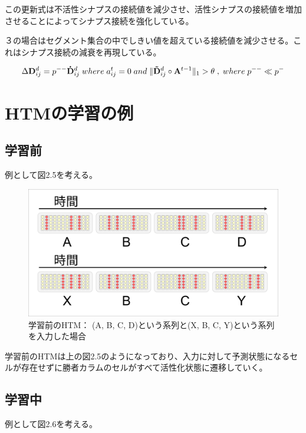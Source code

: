 この更新式は不活性シナプスの接続値を減少させ、活性シナプスの接続値を増加させることによってシナプス接続を強化している。

３の場合はセグメント集合の中でしきい値を超えている接続値を減少させる。これはシナプス接続の減衰を再現している。

\begin{equation}
  \Delta {\bf D}^d_{ij} = p^{--}{\bf \dot{D}}^d_{ij} \; where \; a^t_{ij} = 0 \; and \; \|{\bf \tilde{D}}^d_{ij} \circ {\bf A}^{t-1}\|_1 > \theta \; , \; where \; p^{--} \ll p^-
\end{equation}

\section{HTMの学習の例}

\subsection{学習前}
例として図2.5を考える。

\begin{figure}[ht]
  \begin{center}
    \includegraphics[width=14cm]{./fig/drawing_5}
    \caption{学習前のHTM： (A, B, C, D)という系列と(X, B, C, Y)という系列を入力した場合}
    \label{fig:HTM_before_learning}
  \end{center}
\end{figure}

学習前のHTMは上の図2.5のようになっており、入力に対して予測状態になるセルが存在せずに勝者カラムのセルがすべて活性化状態に遷移していく。

\subsection{学習中}
例として図2.6を考える。

